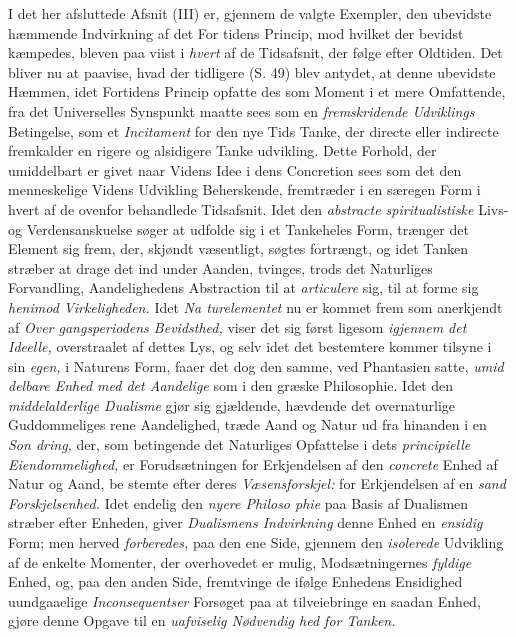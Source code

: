 I det her afsluttede Afsnit (III) er, gjennem de valgte
Exempler, den ubevidste hæmmende Indvirkning af det For\-%
tidens Princip, mod hvilket der bevidst kæmpedes, bleven paa\-%
viist i \emph{hvert} af de Tidsafsnit, der følge efter Oldtiden. Det
bliver nu at paavise, hvad der tidligere (S. 49) blev antydet,
at denne ubevidste Hæmmen, idet Fortidens Princip opfatte\-%
des som Moment i et mere Omfattende, fra det Universelles
Synspunkt maatte sees som en \emph{fremskridende Udviklings}
Betingelse, som et \emph{Incitament} for den nye Tids Tanke, der
directe eller indirecte fremkalder en rigere og alsidigere Tanke\-%
udvikling. Dette Forhold, der umiddelbart er givet naar Videns
Idee i dens Concretion sees som det den menneskelige Videns
Udvikling Beherskende, fremtræder i en særegen Form i hvert
af de ovenfor behandlede Tidsafsnit. Idet den \emph{abstracte
spiritualistiske} Livs- og Verdensanskuelse søger at udfolde
sig i et Tankeheles Form, trænger det Element sig frem, der,
skjøndt væsentligt, søgtes fortrængt, og idet Tanken stræber
at drage det ind under Aanden, tvinges, trods det Naturliges
Forvandling, Aandelighedens Abstraction til at \emph{articulere}
sig, til at forme sig \emph{henimod Virkeligheden.} Idet \emph{Na\-%
turelementet} nu er kommet frem som anerkjendt af \emph{Over\-%
gangsperiodens Bevidsthed,} viser det sig først ligesom
\emph{igjennem det Ideelle,} overstraalet af dettes Lys, og selv
idet det bestemtere kommer tilsyne i sin \emph{egen,} i Naturens
Form, faaer det dog den samme, ved Phantasien satte, \emph{umid\-%
delbare Enhed med det Aandelige} som i den græske
Philosophie. Idet den \emph{middelalderlige Dualisme} gjør sig
gjældende, hævdende det overnaturlige Guddommeliges rene
Aandelighed, træde Aand og Natur ud fra hinanden i en \emph{Son\-%
dring,} der, som betingende det Naturliges Opfattelse i dets
\emph{principielle Eiendommelighed,} er Forudsætningen for
Erkjendelsen af den \emph{concrete} Enhed af Natur og Aand, be\-%
stemte efter deres \emph{Væsensforskjel:} for Erkjendelsen af en
\emph{sand Forskjelsenhed.} Idet endelig den \emph{nyere Philoso\-%
phie} paa Basis af Dualismen stræber efter Enheden, giver
\emph{Dualismens Indvirkning} denne Enhed en \emph{ensidig} Form;
men herved \emph{forberedes,} paa den ene Side, gjennem den
\emph{isolerede} Udvikling af de enkelte Momenter, der overhovedet
er mulig, Modsætningernes \emph{fyldige} Enhed, og, paa den anden
Side, fremtvinge de ifølge Enhedens Ensidighed uundgaaelige
\emph{Inconsequentser} Forsøget paa at tilveiebringe en saadan
Enhed, gjøre denne Opgave til en \emph{uafviselig Nødvendig\-%
hed for Tanken.}

